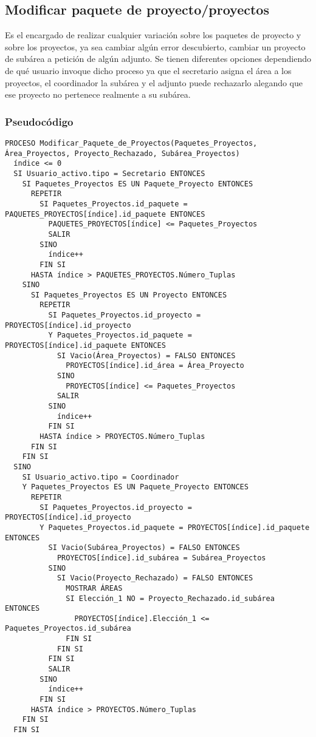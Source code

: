\documentclass[12pt,a4paper,spanish,twoside]{book}
\begin{document}
\subsection{Modificar paquete de proyecto/proyectos}
Es el encargado de realizar cualquier variación sobre los paquetes de proyecto y
sobre los proyectos, ya sea cambiar algún error descubierto, cambiar un proyecto
de subárea a petición de algún adjunto. Se tienen diferentes opciones 
dependiendo de qué usuario invoque dicho proceso ya que el secretario asigna el 
área a los proyectos, el coordinador la subárea y el adjunto puede rechazarlo 
alegando que ese proyecto no pertenece realmente a su subárea.

\subsubsection{Pseudocódigo}
\begin{lstlisting}[inputencoding=utf8/latin1]
PROCESO Modificar_Paquete_de_Proyectos(Paquetes_Proyectos, Área_Proyectos, Proyecto_Rechazado, Subárea_Proyectos)
  índice <= 0
  SI Usuario_activo.tipo = Secretario ENTONCES
    SI Paquetes_Proyectos ES UN Paquete_Proyecto ENTONCES
      REPETIR
        SI Paquetes_Proyectos.id_paquete = PAQUETES_PROYECTOS[índice].id_paquete ENTONCES
          PAQUETES_PROYECTOS[índice] <= Paquetes_Proyectos
          SALIR
        SINO
          índice++
        FIN SI
      HASTA índice > PAQUETES_PROYECTOS.Número_Tuplas
    SINO
      SI Paquetes_Proyectos ES UN Proyecto ENTONCES
        REPETIR
          SI Paquetes_Proyectos.id_proyecto = PROYECTOS[índice].id_proyecto 
          Y Paquetes_Proyectos.id_paquete = PROYECTOS[índice].id_paquete ENTONCES
            SI Vacio(Área_Proyectos) = FALSO ENTONCES
              PROYECTOS[índice].id_área = Área_Proyecto
            SINO
              PROYECTOS[índice] <= Paquetes_Proyectos
            SALIR
          SINO
            índice++
          FIN SI
        HASTA índice > PROYECTOS.Número_Tuplas
      FIN SI
    FIN SI
  SINO
    SI Usuario_activo.tipo = Coordinador
    Y Paquetes_Proyectos ES UN Paquete_Proyecto ENTONCES
      REPETIR
        SI Paquetes_Proyectos.id_proyecto = PROYECTOS[índice].id_proyecto
        Y Paquetes_Proyectos.id_paquete = PROYECTOS[índice].id_paquete  ENTONCES
          SI Vacio(Subárea_Proyectos) = FALSO ENTONCES
            PROYECTOS[índice].id_subárea = Subárea_Proyectos
          SINO
            SI Vacio(Proyecto_Rechazado) = FALSO ENTONCES
              MOSTRAR ÁREAS
              SI Elección_1 NO = Proyecto_Rechazado.id_subárea ENTONCES
                PROYECTOS[índice].Elección_1 <= Paquetes_Proyectos.id_subárea
              FIN SI
            FIN SI
          FIN SI
          SALIR
        SINO
          índice++
        FIN SI
      HASTA índice > PROYECTOS.Número_Tuplas
    FIN SI
  FIN SI
\end{lstlisting}
\end{document}
